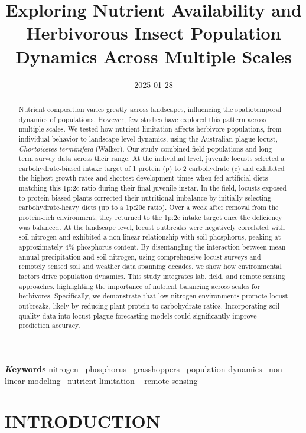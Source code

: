 \documentclass[
]{article}
\title{Exploring Nutrient Availability and Herbivorous Insect Population
Dynamics Across Multiple Scales}
\author{\asep\asep\asep\asep\asep\asep\asep\asep\asep}
\date{2025-01-28}
\begin{document}
\maketitle
\begin{abstract}
Nutrient composition varies greatly across landscapes, influencing the
spatiotemporal dynamics of populations. However, few studies have
explored this pattern across multiple scales. We tested how nutrient
limitation affects herbivore populations, from individual behavior to
landscape-level dynamics, using the Australian plague locust,
\emph{Chortoicetes terminifera} (Walker). Our study combined field
populations and long-term survey data across their range. At the
individual level, juvenile locusts selected a carbohydrate-biased intake
target of 1 protein (p) to 2 carbohydrate (c) and exhibited the highest
growth rates and shortest development times when fed artificial diets
matching this 1p:2c ratio during their final juvenile instar. In the
field, locusts exposed to protein-biased plants corrected their
nutritional imbalance by initially selecting carbohydrate-heavy diets
(up to a 1p:20c ratio). Over a week after removal from the protein-rich
environment, they returned to the 1p:2c intake target once the
deficiency was balanced. At the landscape level, locust outbreaks were
negatively correlated with soil nitrogen and exhibited a non-linear
relationship with soil phosphorus, peaking at approximately 4\%
phosphorus content. By disentangling the interaction between mean annual
precipitation and soil nitrogen, using comprehensive locust surveys and
remotely sensed soil and weather data spanning decades, we show how
environmental factors drive population dynamics. This study integrates
lab, field, and remote sensing approaches, highlighting the importance
of nutrient balancing across scales for herbivores. Specifically, we
demonstrate that low-nitrogen environments promote locust outbreaks,
likely by reducing plant protein-to-carbohydrate ratios. Incorporating
soil quality data into locust plague forecasting models could
significantly improve prediction accuracy.
\end{abstract}
{\bfseries \emph Keywords}
\def\sep{\textbullet\ }
nitrogen \sep phosphorus \sep grasshoppers \sep population
dynamics \sep non-linear modeling \sep nutrient limitation \sep 
remote sensing



\section{INTRODUCTION}\label{introduction}
\end{document}

